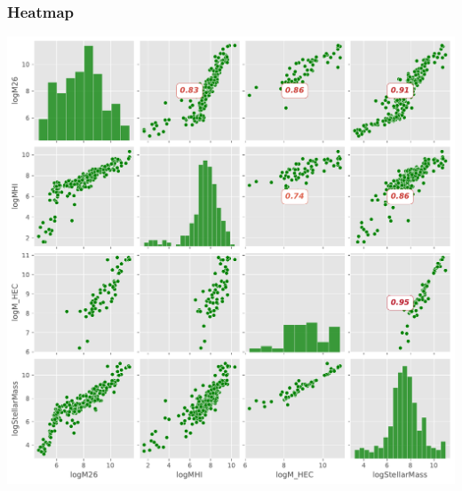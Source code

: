 \documentclass[
]{article}
\begin{document}
\subsubsection{Heatmap}

\includegraphics{compare_files/figure-pdf/cell-45-output-1.pdf}
\end{document}
